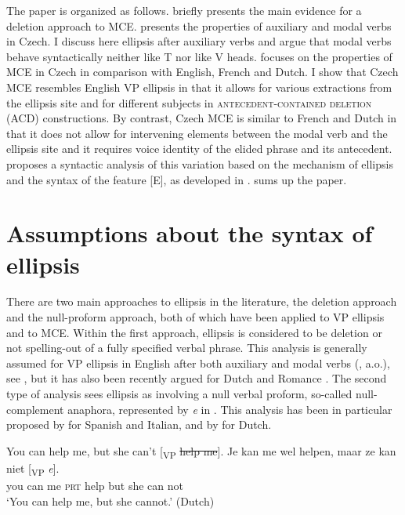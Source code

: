 \documentclass[output=paper,colorlinks,citecolor=brown,
modfonts
]{langscibook}
\begin{document}
\noindent The paper is organized as follows.  briefly presents the main evidence for a deletion approach to MCE.  presents the properties of auxiliary and modal verbs in Czech. I discuss here ellipsis after auxiliary verbs and argue that modal verbs behave syntactically neither like T nor like V heads.  focuses on the properties of MCE in Czech in comparison with English, French and Dutch. I show that Czech MCE resembles English VP ellipsis in that it allows for various extractions from the ellipsis site and for different subjects in \textsc{antecedent-contained deletion} (ACD) constructions. By contrast, Czech MCE is similar to French and Dutch in that it does not allow for intervening elements between the modal verb and the ellipsis site and it requires voice identity of the elided phrase and its antecedent.  proposes a syntactic analysis of this variation based on the mechanism of ellipsis and the syntax of the feature [E], as developed in \cite{Aelbrecht2010}.  sums up the paper. 


\section{Assumptions about the syntax of ellipsis}\label{sec:2}

There are two main approaches to ellipsis in the literature, the deletion approach and the null-proform approach, both of which have been applied to VP ellipsis and to MCE. Within the first approach, ellipsis is considered to be deletion or not spelling-out of a fully specified verbal phrase. This analysis is generally assumed for VP ellipsis in English after both auxiliary and modal verbs (\citealt{ross1967constraints,Sag1976,Hankamer-Sag1976,Merchant2001,Merchant2008a}, a.o.), see , but it has also been recently argued for Dutch \citep{Aelbrecht2008,Aelbrecht2010} and Romance \citep{Dagnac2010}. The second type of analysis sees ellipsis as involving a null verbal proform, so-called null-complement anaphora, represented by \textit{e} in . This analysis has been in particular proposed by \cite{Depiante2001} for Spanish and Italian, and by \cite{Lobeck1995} for Dutch. 

\begin{exe}
\ex 
\begin{xlist}
\ex\label{5a} You can help me, but she can't [\textsubscript{VP} \sout{help me}].
\ex \label{5b}
\gll Je    kan me wel  helpen, maar ze kan niet [\textsubscript{VP} \textit{e}].  \\
 you can me \textsc{prt}  help  but  she can not \\
\glt `You can help me, but she cannot.' \hfill (Dutch)
\end{xlist}
\end{exe}
\end{document}
